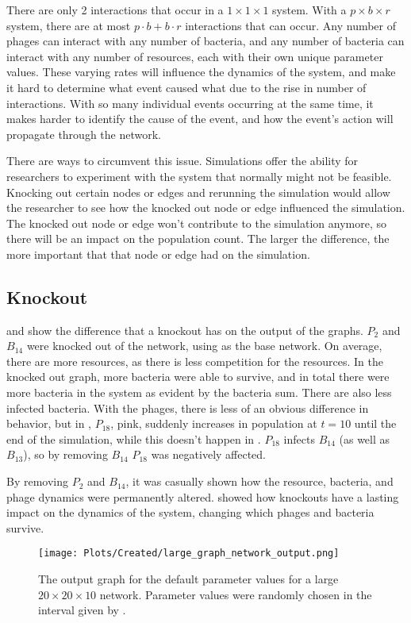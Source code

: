 There are only 2 interactions that occur in a $1\times1\times1$ system. 
With a $p\times b\times r$ system, there are at most $p\cdot b + b\cdot r$ interactions that can occur. 
Any number of phages can interact with any number of bacteria, and any number of bacteria can interact with any number of resources, each with their own unique parameter values. 
These varying rates will influence the dynamics of the system, and make it hard to determine what event caused what due to the rise in number of interactions.
With so many individual events occurring at the same time, it makes harder to identify the cause of the event, and how the event's action will propagate through the network. 

There are ways to circumvent this issue. 
Simulations offer the ability for researchers to experiment with the system that normally might not be feasible. 
Knocking out certain nodes or edges and rerunning the simulation would allow the researcher to see how the knocked out node or edge influenced the simulation. 
The knocked out node or edge won't contribute to the simulation anymore, so there will be an impact on the population count. 
The larger the difference, the more important that that node or edge had on the simulation. 

\subsection{Knockout}
 and 
show the difference that a knockout has on the output of the graphs. 
$P_2$ and $B_14$ were knocked out of the network, using  as the base network. 
On average, there are more resources, as there is less competition for the resources. 
In the knocked out graph, more bacteria were able to survive, and in total there were more bacteria in the system as evident by the bacteria sum. 
There are also less infected bacteria. 
With the phages, there is less of an obvious difference in behavior, but in , $P_18$, pink, suddenly increases in population at $t=10$ until the end of the simulation, while this doesn't happen in . 
$P_18$ infects $B_14$ (as well as $B_13$), so by removing $B_14$ $P_18$ was negatively affected. 

By removing $P_2$ and $B_14$, it was casually shown how the resource, bacteria, and phage dynamics were permanently altered. 
 showed how knockouts have a lasting impact on the dynamics of the system, changing which phages and bacteria survive. 
\begin{figure}
    \texttt{[image: Plots/Created/large\_graph\_network\_output.png]}
    \centering
    \caption{
        The output graph for the default parameter values for a large $20\times 20 \times 10$ network. 
        Parameter values were randomly chosen in the interval given by . 
    }
    \label{fig:created:large_graph_network_output}
\end{figure}

